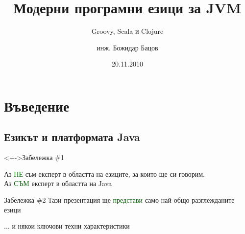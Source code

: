 \documentclass[compress,red]{beamer}
\title{Модерни програмни езици за JVM}
\subtitle{Groovy, Scala и Clojure}
\author{инж. Божидар Бацов}
\institute{Drow Ltd. \vspace{.25cm}OpenFest 2010}
\date{20.11.2010}
\begin{document}

\frame{
  \titlepage 
}




\section{Въведение}
\subsection{Езикът и платформата Java}


\begin{frame}
  \begin{center}
    \begin{block}<+->{Забележка \#1}
      \vspace{.1cm}
      \begin{center} \large
	Аз \textcolor{darkgreen}{НЕ} съм експерт в областта на
        езиците, за които ще си говорим.\\ \vspace{.1cm}
	Аз \textcolor{darkgreen}{СЪМ} експерт в областта на Java\\
      \end{center}
    \end{block}
    \vspace{1cm}
    \begin{block}{Забележка \#2}
      \vspace{.1cm}
      Тази презентация ще \textcolor{darkgreen}{представи} само
      най-общо разглежданите езици\\ \vspace{.1cm}
      \begin{center}
	$\dots$ и някои ключови техни характеристики\\
      \end{center}
    \end{block}
  \end{center}
\end{frame}
\end{document}
